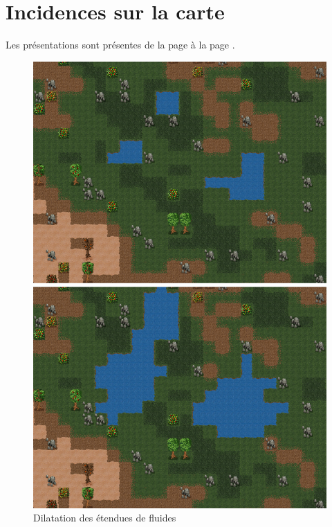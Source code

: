 \documentclass[a4paper]{article}
\newcommand{\alinea}{\hspace*{0.5cm}}
\begin{document}
    \section{Incidences sur la carte}
      \alinea Les présentations sont présentes de la page \pageref{IncidenceDeb} à la page \pageref{IncidenceFin}.
      \begin{figure}
        \begin{center}
          \includegraphics[scale=0.45]{img/DilateFluid.png}
        \end{center}
        \label{IncidenceDeb}
        \caption{Dilatation des étendues de fluides}
      \end{figure}
\end{document}
